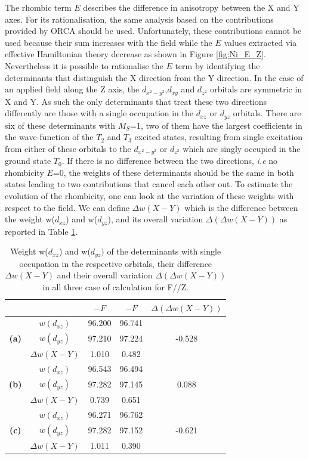 \documentclass[10pt]{report}
\numberwithin{equation}{section}
\begin{document}
The rhombic term $E$ describes the difference in anisotropy between the X and Y axes. For its rationalisation, the same analysis based on the contributions provided by ORCA should be used.
Unfortunately, these contributions cannot be used because their sum increases with the field while the $E$ values extracted via effective Hamiltonian theory decrease as shown in Figure \ref{fig:Ni_E_Z}.
Nevertheless it is possible to rationalise the $E$ term by identifying the determinants that distinguish the X direction from the Y direction. 
In the case of an applied field along the Z axis, the $d_{x^2-y^2}$,$d_{xy}$ and $d_{z^2}$ orbitals are symmetric in X and Y. As such the only determinants that treat these two directions differently are those with a single occupation in the $d_{xz}$ or $d_{yz}$ orbitals.
There are six of these determinants with $M_S$=1, two of them have the largest coefficients in the wave-function of the $T_2$ and $T_3$ excited states, resulting from single excitation from either of these orbitals to the $d_{x^2-y^2}$ or $d_{z^2}$ which are singly occupied in the ground state $T_0$.
If there is no difference between the two directions, \textit{i.e} no rhombicity $E$=0, the weights of these determinants should be the same in both states leading to two contributions that cancel each other out. 
To estimate the evolution of the rhombicity, one can look at the variation of these weights with respect to the field.
We can define $\Delta w(X-Y)$ which is the difference between the weight w($d_{xz}$) and w($d_{yz}$), and its overall variation $\Delta (\Delta w(X-Y))$ as reported in Table \ref{tab:PoidsZ}.

\begin{table}[h]
    \centering
    \begin{tabular}{c | c | c c | c }
        & &  $-F$ & $-F$ & $\Delta (\Delta w(X-Y))$\\
        \hline
        \multirow{3}{*}{\textbf{(a)}}
        &$w(d_{xz})$ &  96.200 & 96.741 & \\
        &$w(d_{yz})$ &  97.210 & 97.224 & -0.528\\
        &$\Delta w(X-Y)$ & 1.010 & 0.482& \\
        \hline
        \multirow{3}{*}{\textbf{(b)}}
        &$w(d_{xz})$ &  96.543 & 96.494 & \\
        &$w(d_{yz})$ &  97.282 & 97.145 & 0.088\\
        &$\Delta w(X-Y)$ & 0.739 & 0.651& \\
        \hline
        \multirow{3}{*}{\textbf{(c)}}
        &$w(d_{xz})$ &  96.271 & 96.762 & \\
        &$w(d_{yz})$ &  97.282 & 97.152 & -0.621\\
        &$\Delta w(X-Y)$ & 1.011 & 0.390& \\
        \hline
    \end{tabular}
    \caption{Weight w($d_{xz}$) and w($d_{yz})$ of the determinants with single occupation in the respective orbitals, their difference $\Delta w(X-Y)$ and their overall variation $\Delta (\Delta w(X-Y))$ in all three case of calculation for F//Z. }
    \label{tab:PoidsZ}
\end{table}
\end{document}
